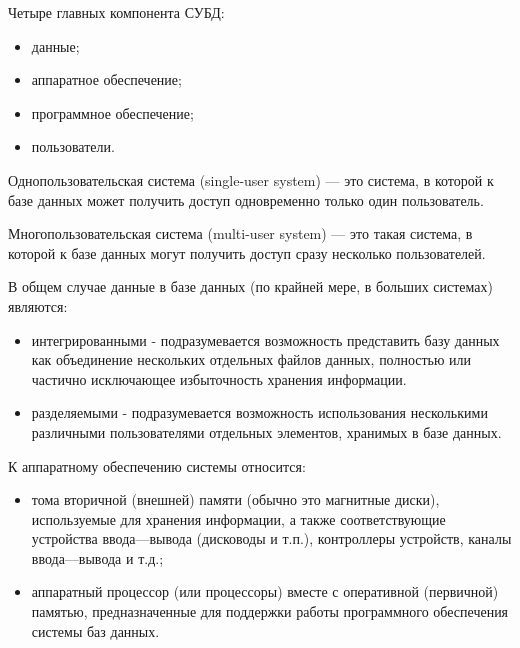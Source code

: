 \documentclass{beamer}
\begin{document}
\begin{frame}
Четыре главных компонента СУБД:
\begin{itemize}
\item данные;
\item аппаратное обеспечение;
\item программное обеспечение;
\item пользователи.
\end{itemize}

Однопользовательская система (single-user system) — это система, в которой к базе данных может получить доступ одновременно только один пользователь. 

Многопользовательская система (multi-user system) — это такая система, в которой к базе данных могут получить доступ сразу несколько пользователей.

В общем случае данные в базе данных (по крайней мере, в больших системах) являются:
\begin{itemize}
\item интегрированными - подразумевается возможность представить базу
данных как объединение нескольких отдельных файлов данных, полностью или частично исключающее избыточность хранения информации.
\item разделяемыми - подразумевается возможность использования несколькими различными пользователями отдельных элементов, хранимых в базе данных.
\end{itemize}
\end{frame}

\begin{frame}
К аппаратному обеспечению системы относится:
\begin{itemize}
\item тома вторичной (внешней) памяти (обычно это магнитные диски), используемые
для хранения информации, а также соответствующие устройства ввода—вывода
(дисководы и т.п.), контроллеры устройств, каналы ввода—вывода и т.д.;
\item аппаратный процессор (или процессоры) вместе с оперативной (первичной) памятью, предназначенные для поддержки работы программного обеспечения системы
баз данных.
\end{itemize}
\end{frame}
\end{document}
